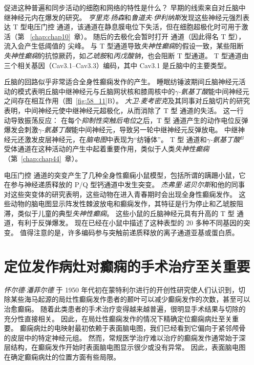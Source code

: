 促进这种普遍和同步活动的细胞和网络的特性是什么？
早期的线索来自对丘脑中继神经元内在爆发的研究。
\textit{亨里克$\cdot$扬森}和\textit{鲁道夫$\cdot$伊利纳斯}发现这些神经元强烈表达 T 型电压门控  通道，该通道在静息膜电位下失活，但在细胞超极化时可用于激活（第 ~\ref{chap:chap10}~章）。
随后的去极化会暂时打开  通道（因此得名 T 型）， 流入会产生低阈值的  尖峰。
与 T 型通道导致\textit{失神性癫痫}的假设一致，某些阻断\textit{失神性癫痫}的抗惊厥药，如\textit{乙琥胺}和\textit{丙戊酸钠}，也会阻断 T 型通道。
T 型通道由三个相关基因（Cav3.1–Cav3.3）编码，其中 Cav3.1 是丘脑中的主要类型。


丘脑的回路似乎非常适合全身性癫痫发作的产生。
睡眠纺锤波期间丘脑神经元活动的模式表明丘脑中继神经元与丘脑网状核和膝周核中的\textit{$\gamma$-氨基丁酸}能中间神经元之间存在相互作用（图~\ref{fig:58_11}B）。
\textit{大卫$\cdot$麦考密克}及其同事对丘脑切片的研究表明，中间神经元使中继神经元超极化，从而消除了 T 型  通道的失活。
这一行动导致振荡反应：
在每个\textit{抑制性突触后电位}之后，T 型  通道产生的动作电位反弹爆发会刺激\textit{$\gamma$-氨基丁酸}能中间神经元，导致另一轮中继神经元反弹放电。
中继神经元还激发皮层神经元，在\textit{脑电图}中表现为“纺锤体”。
T 型  通道和\textit{$\gamma$-氨基丁酸}$^B$ 受体通道在这种活动的产生中起着重要作用，类似于人类\textit{失神性癫痫}（第~\ref{chap:chap44}~章）。


电压门控  通道的突变产生了几种全身性癫痫小鼠模型，包括所谓的蹒跚小鼠，它在参与神经递质释放的 P/Q 型钙通道中发生突变。
\textit{杰弗里$\cdot$诺贝尔斯}和他的同事对这些突变体的研究表明，这些动物在进入青春期时会出现全身性癫痫发作。
这些动物的脑电图显示阵发性棘波放电和癫痫发作，其特征是行为停止和乙琥胺阻滞，类似于儿童的典型\textit{失神性癫痫}。
这些小鼠的丘脑神经元具有升高的 T 型  通道，有利于反弹爆发。
现在已经在小鼠中描述了这种表型的 20 多种不同基因的突变。
值得注意的是，许多编码参与突触前递质释放的离子通道亚基或蛋白质。



\section{定位发作病灶对癫痫的手术治疗至关重要}

\textit{怀尔德$\cdot$潘菲尔德 }于 1950 年代初在蒙特利尔进行的开创性研究使人们认识到，切除某些海马起源的局灶性癫痫发作患者的颞叶可以减少癫痫发作的次数，甚至可以治愈癫痫。
随着此类患者的手术治疗变得越来越普遍，很明显手术结果与切除的充分性直接相关。
因此，在局灶性癫痫发作的情况下精确定位癫痫病灶至关重要。
癫痫病灶的电映射最初依赖于表面脑电图，我们已经看到它偏向于紧邻颅骨的皮层中的特定神经元组。
然而，常规医学治疗难以治疗的癫痫发作通常始于深层结构，在癫痫发作开始时表面脑电图显示很少或没有异常。
因此，表面脑电图在确定癫痫病灶的位置方面有些局限。



